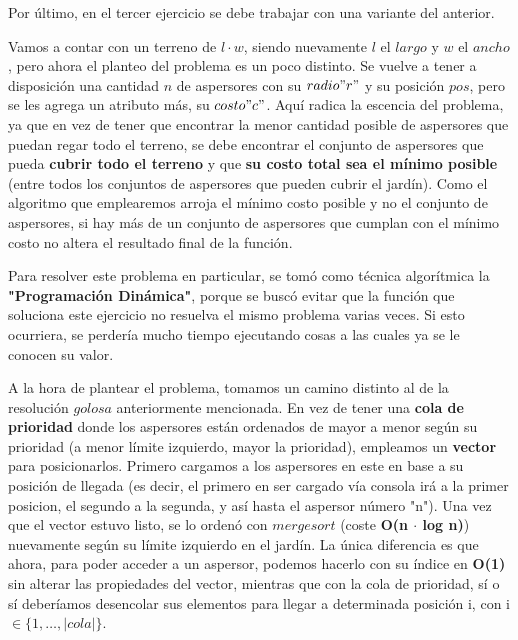 \documentclass[./main.tex]{subfiles}
\begin{document}
Por último, en el tercer ejercicio se debe trabajar con una variante del anterior. 
\newline

Vamos a contar con un terreno de $l \cdot w$, siendo nuevamente $l$ el $largo$ y $w$ el $ancho$, pero ahora el planteo del problema es un poco distinto. Se vuelve a tener a disposición una cantidad $n$ de aspersores con su $radio "r"$ y su posición \(pos\), pero se les agrega un atributo más, su $costo "c"$. Aquí radica la escencia del problema, ya que en vez de tener que encontrar la menor cantidad posible de aspersores que puedan regar todo el terreno, se debe encontrar el conjunto de aspersores que pueda \textbf{cubrir todo el terreno} y que \textbf{su costo total sea el mínimo posible} (entre todos los conjuntos de aspersores que pueden cubrir el jardín). Como el algoritmo que emplearemos arroja el mínimo costo posible y no el conjunto de aspersores, si hay más de un conjunto de aspersores que cumplan con el mínimo costo no altera el resultado final de la función.
\newline

Para resolver este problema en particular, se tomó como técnica algorítmica la \textbf{"Programación Dinámica"}, porque se buscó evitar que la función que soluciona este ejercicio no resuelva el mismo problema varias veces. Si esto ocurriera, se perdería mucho tiempo ejecutando cosas a las cuales ya se le conocen su valor.
\newline

A la hora de plantear el problema, tomamos un camino distinto al de la resolución \(golosa\) anteriormente mencionada. En vez de tener una \textbf{cola de prioridad} donde los aspersores están ordenados de mayor a menor según su prioridad (a menor límite izquierdo, mayor la prioridad), empleamos un \textbf{vector} para posicionarlos. Primero cargamos a los aspersores en este en base a su posición de llegada (es decir, el primero en ser cargado vía consola irá a la primer posicion, el segundo a la segunda, y así hasta el aspersor número "n"). Una vez que el vector estuvo listo, se lo ordenó con $mergesort$ (coste \textbf{O(n $\cdot$ log n)}) nuevamente según su límite izquierdo en el jardín. La única diferencia es que ahora, para poder acceder a un aspersor, podemos hacerlo con su índice en \textbf{O(1)} sin alterar las propiedades del vector, mientras que con la cola de prioridad, sí o sí deberíamos desencolar sus elementos para llegar a determinada posición i, con i \(\in \lbrace 1, \ldots, |cola| \rbrace\).
\newline
\end{document}
